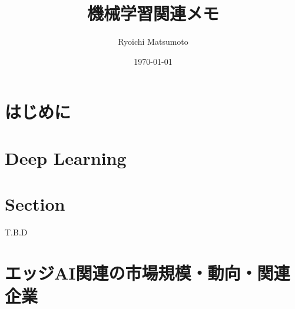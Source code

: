 \documentclass[11pt,a4paper]{jsarticle}
\title{機械学習関連メモ}
\author{Ryoichi Matsumoto}
\date{\today}
\begin{document}
\maketitle
%
%
\tableofcontents
\listoftables
\listoffigures
%
%

\section{はじめに}


\section{Deep Learning}


\section{Section}
T.B.D



\appendix

\section{エッジAI関連の市場規模・動向・関連企業}


%
%
\end{document}

